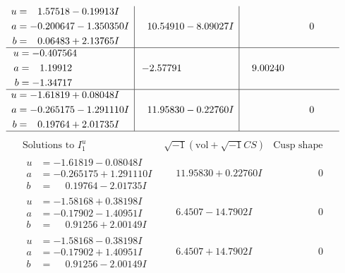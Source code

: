\documentclass[1p]{elsarticle_modified}
\theoremstyle{definition}
\newcommand{\I}{\sqrt{-1}}
\begin{document}
$$\begin{array}{c|c|c}
\begin{aligned}
u &= \phantom{-}1.57518 - 0.19913 I \\
a &= -0.200647 - 1.350350 I \\
b &= \phantom{-}0.06483 + 2.13765 I\end{aligned}
 & \phantom{-}10.54910 - 8.09027 I & \phantom{-0.000000 } 0 \\ \hline\begin{aligned}
u &= -0.407564\phantom{ +0.000000I} \\
a &= \phantom{-}1.19912\phantom{ +0.000000I} \\
b &= -1.34717\phantom{ +0.000000I}\end{aligned}
 & -2.57791\phantom{ +0.000000I} & \phantom{-}9.00240\phantom{ +0.000000I} \\ \hline\begin{aligned}
u &= -1.61819 + 0.08048 I \\
a &= -0.265175 - 1.291110 I \\
b &= \phantom{-}0.19764 + 2.01735 I\end{aligned}
 & \phantom{-}11.95830 - 0.22760 I & \phantom{-0.000000 } 0\\
 \hline 
 \end{array}$$\newpage$$\begin{array}{c|c|c}  
\text{Solutions to }I^u_{1}& \I (\text{vol} + \sqrt{-1}CS) & \text{Cusp shape}\\
 \hline 
\begin{aligned}
u &= -1.61819 - 0.08048 I \\
a &= -0.265175 + 1.291110 I \\
b &= \phantom{-}0.19764 - 2.01735 I\end{aligned}
 & \phantom{-}11.95830 + 0.22760 I & \phantom{-0.000000 } 0 \\ \hline\begin{aligned}
u &= -1.58168 + 0.38198 I \\
a &= -0.17902 - 1.40951 I \\
b &= \phantom{-}0.91256 + 2.00149 I\end{aligned}
 & \phantom{-}6.4507 - 14.7902 I & \phantom{-0.000000 } 0 \\ \hline\begin{aligned}
u &= -1.58168 - 0.38198 I \\
a &= -0.17902 + 1.40951 I \\
b &= \phantom{-}0.91256 - 2.00149 I\end{aligned}
 & \phantom{-}6.4507 + 14.7902 I & \phantom{-0.000000 } 0 \\ \hline\begin{aligned}

\end{aligned}
\end{array}$$
\end{document}
